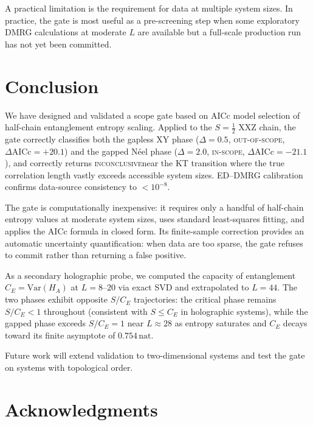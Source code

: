 \documentclass[11pt,letterpaper]{article}
\newcommand{\dAICc}{\Delta\mathrm{AICc}}
\newcommand{\CE}{C_{\!E}}
\newcommand{\half}{\tfrac{1}{2}}
\newcommand{\Neel}{N\'{e}el}
\newcommand{\inscope}{\textsc{in-scope}}
\newcommand{\outscope}{\textsc{out-of-scope}}
\newcommand{\inconclusive}{\textsc{inconclusive}}
\begin{document}
A practical limitation is the requirement for data at multiple system
sizes.  In practice, the gate is most useful as a pre-screening step when
some exploratory DMRG calculations at moderate $L$ are available but a
full-scale production run has not yet been committed.

\section{Conclusion}
\label{sec:conclusion}

We have designed and validated a scope gate based on AICc model selection
of half-chain entanglement entropy scaling.  Applied to the $S=\half$ XXZ
chain, the gate correctly classifies both the gapless XY phase ($\Delta=0.5$,
\outscope, $\dAICc = +20.1$) and the gapped \Neel{} phase ($\Delta=2.0$,
\inscope, $\dAICc = -21.1$), and correctly returns \inconclusive near the
KT transition where the true correlation length vastly exceeds accessible
system sizes.  ED--DMRG calibration confirms data-source consistency to
$<10^{-8}$.

The gate is computationally inexpensive: it requires only a handful of
half-chain entropy values at moderate system sizes, uses standard
least-squares fitting, and applies the AICc formula in closed form.  Its
finite-sample correction provides an automatic uncertainty quantification:
when data are too sparse, the gate refuses to commit rather than returning a
false positive.

As a secondary holographic probe, we computed the capacity of entanglement
$\CE = \mathrm{Var}(H_A)$ at $L = 8$–$20$ via exact SVD and extrapolated
to $L = 44$.  The two phases exhibit opposite $S/\CE$ trajectories: the
critical phase remains $S/\CE < 1$ throughout (consistent with $S \le \CE$
in holographic systems), while the gapped phase exceeds $S/\CE = 1$ near
$L \approx 28$ as entropy saturates and $\CE$ decays toward its finite
asymptote of $0.754\,\mathrm{nat}$.

Future work will extend validation to two-dimensional systems and test the
gate on systems with topological order.

\section*{Acknowledgments}
\end{document}
